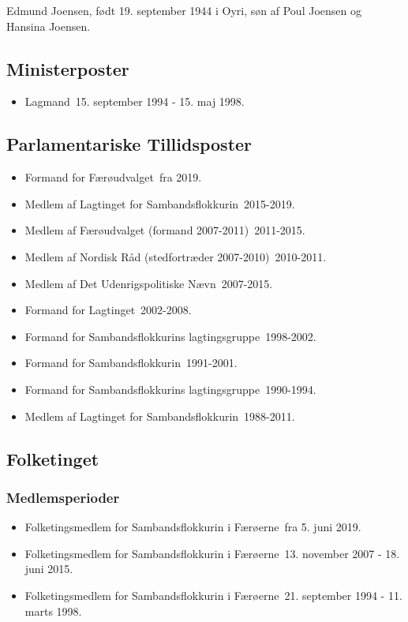 \documentclass[11pt, a4paper]{awesome-cv}
\begin{document}
\makecvheader[R]
\makelettertitle
\begin{cvletter}
Edmund Joensen, født 19. september 1944 i Oyri, søn af Poul Joensen og Hansina Joensen.

\subsection*{Ministerposter}
\begin{itemize}
\item Lagmand 15. september 1994 - 15. maj 1998.
\end{itemize}
\subsection*{Parlamentariske Tillidsposter}
\begin{itemize}
\item Formand for Færøudvalget fra 2019.
\item Medlem af Lagtinget for Sambandsflokkurin 2015-2019.
\item Medlem af Færøudvalget (formand 2007-2011) 2011-2015.
\item Medlem af Nordisk Råd (stedfortræder 2007-2010) 2010-2011.
\item Medlem af Det Udenrigspolitiske Nævn 2007-2015.
\item Formand for Lagtinget 2002-2008.
\item Formand for Sambandsflokkurins lagtingsgruppe 1998-2002.
\item Formand for Sambandsflokkurin 1991-2001.
\item Formand for Sambandsflokkurins lagtingsgruppe 1990-1994.
\item Medlem af Lagtinget for Sambandsflokkurin 1988-2011.
\end{itemize}
\subsection*{Folketinget}
\subsubsection*{Medlemsperioder}
\begin{itemize}
\item Folketingsmedlem for Sambandsflokkurin i Færøerne fra 5. juni 2019.
\item Folketingsmedlem for Sambandsflokkurin i Færøerne 13. november 2007 - 18. juni 2015.
\item Folketingsmedlem for Sambandsflokkurin i Færøerne 21. september 1994 - 11. marts 1998.
\end{itemize}

\end{cvletter}
\end{document}
